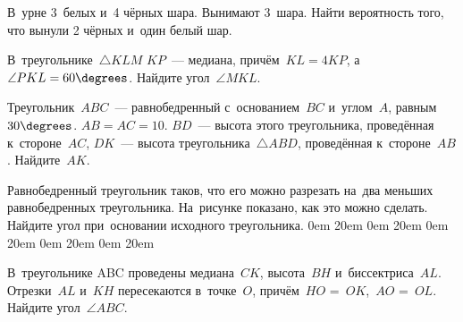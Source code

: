 В~урне 3~белых и~4 чёрных шара. Вынимают 3~шара. Найти вероятность того, что вынули 2 чёрных и~один белый шар. 

В~треугольнике~$\triangle KLM$ $KP$~--- медиана, причём~$KL = 4 KP$, 
а~$\angle PKL = 60\degrees$. 
Найдите угол~$\angle MKL$.

Треугольник~$ABC$~--- равнобедренный с~основанием~$BC$ и~углом~$A$, равным~$30\degrees$. 
$AB = AC = 10$. $BD$~--- высота этого треугольника, проведённая к~стороне~$AC$, 
$DK$~--- высота треугольника~$\triangle ABD$, проведённая к~стороне~$AB$. Найдите~$AK$.

\begin{wrapfigure}[0]{r}{30mm}
\vspace{-6mm}
\end{wrapfigure}

Равнобедренный треугольник таков, что его можно разрезать на~два меньших равнобедренных треугольника. На~рисунке показано, как это можно сделать. 
Найдите угол при~основании исходного треугольника.
 0em 20em 0em 20em 0em 20em 0em 20em 0em 20em

В~треугольнике ABC проведены медиана~$CK$, высота~$BH$ и~биссектриса~$AL$. Отрезки~$AL$ и~$KH$ пересекаются в~точке~$O$, причём~$HO$ =~$OK$,~$AO$ =~$OL$. Найдите угол~$\angle ABC$.

\begin{wrapfigure}[0]{r}{30mm}
\vspace{-10mm}
\end{wrapfigure}

